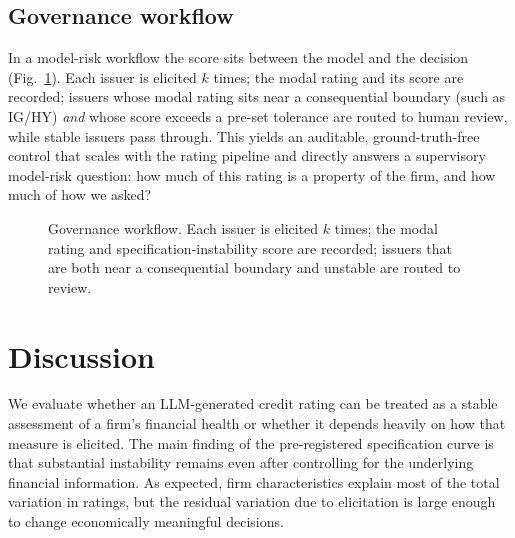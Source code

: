 \documentclass[a4paper,fleqn]{cas-sc}
\begin{document}
\subsection{Governance workflow}\label{sec:sis-gov}
In a model-risk workflow the score sits between the model and the decision (Fig.~\ref{fig:governance}).
Each issuer is elicited $k$ times; the modal rating and its score are recorded; issuers whose modal rating
sits near a consequential boundary (such as IG/HY) \emph{and} whose score exceeds a pre-set tolerance are
routed to human review, while stable issuers pass through. This yields an auditable, ground-truth-free
control that scales with the rating pipeline and directly answers a supervisory model-risk question:
how much of this rating is a property of the firm, and how much of how we asked?

\begin{figure}[t]\centering
{}
\caption{Governance workflow. Each issuer is elicited $k$ times; the modal rating and specification-instability
score are recorded; issuers that are both near a consequential boundary and unstable are routed to review.}
\label{fig:governance}
\end{figure}

\section{Discussion}
We evaluate whether an LLM-generated credit rating can be treated as a stable assessment of a firm's
financial health or whether it depends heavily on how that measure is elicited. The main finding of the
pre-registered specification curve is that substantial instability remains even after controlling for the
underlying financial information. As expected, firm characteristics explain most of the total variation
in ratings, but the residual variation due to elicitation is large enough to change economically
meaningful decisions.
\end{document}

